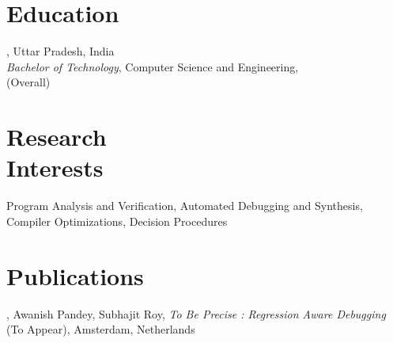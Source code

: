 \documentclass[mm]{simple_style}
\begin{document}
\begin{resume}

\section{Education}
, Uttar Pradesh, India\\
{\sl Bachelor of Technology}, Computer Science and Engineering, \\
 (Overall)\\
\sectionline

\section{Research\\Interests}
\par
Program Analysis and Verification, Automated Debugging and Synthesis, \\Compiler Optimizations, Decision Procedures

\section{Publications}
, Awanish Pandey, Subhajit Roy, \textit{To Be Precise : Regression Aware Debugging} \\ (To Appear), Amsterdam, Netherlands

\vspace{3ex}

\end{resume}
\end{document}
